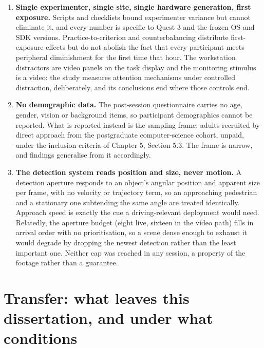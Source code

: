 \begin{enumerate}
  reel's cost is taken from the published literature \citep{ai2025} rather than verified internally.
\item \textbf{Single experimenter, single site, single hardware generation, first exposure.} Scripts
  and checklists bound experimenter variance but cannot eliminate it, and every number is specific to
  Quest 3 and the frozen OS and SDK versions. Practice-to-criterion and counterbalancing distribute
  first-exposure effects but do not abolish the fact that every participant meets peripheral
  diminishment for the first time that hour. The workstation distractors are video panels on the
  task display and the monitoring stimulus is a video: the study measures attention mechanisms under
  controlled distraction, deliberately, and its conclusions end where those controls end.
\item \textbf{No demographic data.} The post-session questionnaire carries no age, gender, vision or
  background items, so participant demographics cannot be reported. What is reported instead is the
  sampling frame: adults recruited by direct approach from the postgraduate computer-science cohort,
  unpaid, under the inclusion criteria of Chapter 5, Section 5.3. The frame is narrow, and findings
  generalise from it accordingly.
\item \textbf{The detection system reads position and size, never motion.} A detection aperture
  responds to an object's angular position and apparent size per frame, with no velocity or
  trajectory term, so an approaching pedestrian and a stationary one subtending the same angle are
  treated identically. Approach speed is exactly the cue a driving-relevant deployment would need.
  Relatedly, the aperture budget (eight live, sixteen in the video path) fills in arrival order with
  no prioritisation, so a scene dense enough to exhaust it would degrade by dropping the newest
  detection rather than the least important one. Neither cap was reached in any session, a property
  of the footage rather than a guarantee.
\end{enumerate}

\section{Transfer: what leaves this dissertation, and under what conditions}


